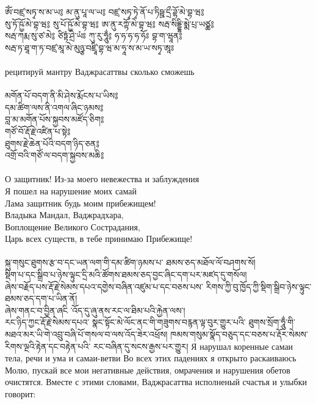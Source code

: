 \newpage
\ti
ཨོཾ་བཛྲ་སཏྭ་ས་མ་ཡ༔ མ་ནུ་པཱ་ལ་ཡ༔ བཛྲ་སཏྭ་ཏྭེ་ནོ་པ་ཏིཥྛ་དྲྀ་ཌྷོ་མེ་བྷ་ཝ༔ \\
སུ་ཏོ་ཥྱོ་མེ་བྷ་ཝ༔ སུ་པོ་ཥྱོ་མེ་བྷ་ཝ༔ ཨ་ནུ་རཀྟོ་མེ་བྷ་ཝ༔ སརྦ་སིདྡྷི་མྨེ་པྲ་ཡཙྪ༔ \\
སརྦ་ཀརྨ་སུ་ཙ་མེ༔ ཙིཏྟཾ་ཤྲེ་ཡཾཿ ཀུ་རུ་ཧཱུྂ༔ ཧ་ཧ་ཧ་ཧ་ཧོཿ བྷ་ག་ཝཱན༔ \\
སརྦ་ཏ་ཐཱ་ག་ཏ་བཛྲ་མཱ་མེ་མུཉྩ་བཛྲཱི་བྷ་ཝ་མ་ཧཱ་ས་མ་ཡ་སཏྭ་ཨཱཿ\\
\\
\ru рецитируй мантру Ваджрасаттвы сколько сможешь\\
\\
\ti
མགོན་པོ་བདག་ནི་མི་ཤེས་རྨོངས་པ་ཡིས༔\\
དམ་ཚིག་ལས་ནི་འགལ་ཞིང་ཉམས༔ \\
བླ་མ་མགོན་པོས་སྐྱབས་མཛོད་ཅིག༔ \\
གཙོ་བོ་རྡོ་རྗེ་འཛིན་པ་སྟེ༔ \\
ཐུགས་རྗེ་ཆེན་པོའི་བདག་ཉིད་ཅན༔ \\
འགྲོ་བའི་གཙོ་ལ་བདག་སྐྱབས་མཆི༔\\
\\
\ru
О защитник! Из-за моего невежества и заблуждения\\
 Я пошел на нарушение моих самай\\
Лама защитник будь моим прибежищем!\\
Владыка Мандал, Ваджрадхара,\\
Воплощение Великого Сострадания,\\
Царь всех существ, в тебе принимаю Прибежище!\\
\\
\ti
སྐུ་གསུང་ཐུགས་རྩ་བ་དང་ཡན་ལག་གི་དམ་ཚིག་ཉམས་པ་ ཐམས་ཅད་མཐོལ་ལོ་བཤགས་སོ། \\
སྡིག་པ་དང་སྒྲིབ་པ་ཉེས་ལྟུང་དྲི་མའི་ཚོགས་ཐམས་ཅད་བྱང་ཞིང་དག་པར་མཛད་དུ་གསོལ། \\
ཞེས་བརྗོད་པས་རྡོ་རྗེ་སེམས་དཔའ་དགྱེས་བཞིན་འཛུམ་པ་དང་བཅས་པས་ རིགས་ཀྱི་བུ་ཁྱོད་ཀྱི་སྡིག་སྒྲིབ་ཉེས་ལྟུང་ཐམས་ཅད་དག་པ་ཡིན་ནོ། \\
ཞེས་གནང་བ་བྱིན་ཞངི ་འོད་དུ་ཞུ་ནས་རང་ལ་ཐིམ་པའི་རྐྱེན་ལས་། \\
རང་ཉིད་ཀྱང་རྡོ་རྗེ་སེམས་དཔའ་ སྣང་སྟོང་མེ་ལོང་ནང་གི་གཟུགས་བརྙན་ལྟ་བུར་གྱུར་པའི་ ཐུགས་སྲོག་ཧཱུྂ་གི་མཐའ་མར་ཡི་གེ་འབྲུ་བཞི་པོ་གསལ་བ་ལས་འོད་ཟེར་འཕྲོས། ཁམས་གསུམ་སྣོད་བཅུད་དང་བཅས་པ་རྡོར་སེམས་རིགས་ལྔའི་རྟེན་དང་བརྟེན་པའི་ རང་བཞིན་དུ་སངས་རྒྱས་པར་གྱུར།
\newpage
\ru
Я нарушал коренные самаи тела, речи и ума и самаи-ветви
Во всех этих падениях я открыто раскаиваюсь
Молю, пускай все мои негативные действия, омрачения и нарушения обетов очистятся. Вместе с этими словами, Ваджрасаттва исполненый счастья и улыбки говорит:
